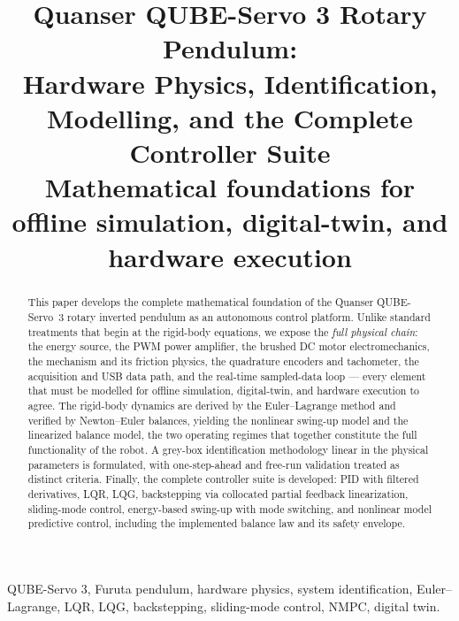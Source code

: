 \documentclass[conference]{IEEEtran}
\begin{document}
\title{Quanser QUBE-Servo 3 Rotary Pendulum:\\ Hardware Physics, Identification, Modelling, and the Complete Controller Suite\\
{\footnotesize Mathematical foundations for offline simulation, digital-twin, and hardware execution}}

\author{
}

\maketitle

\begin{abstract}
This paper develops the complete mathematical foundation of the Quanser QUBE-Servo~3 rotary inverted pendulum as an autonomous control platform. Unlike standard treatments that begin at the rigid-body equations, we expose the \emph{full physical chain}: the energy source, the PWM power amplifier, the brushed DC motor electromechanics, the mechanism and its friction physics, the quadrature encoders and tachometer, the acquisition and USB data path, and the real-time sampled-data loop --- every element that must be modelled for offline simulation, digital-twin, and hardware execution to agree. The rigid-body dynamics are derived by the Euler--Lagrange method and verified by Newton--Euler balances, yielding the nonlinear swing-up model and the linearized balance model, the two operating regimes that together constitute the full functionality of the robot. A grey-box identification methodology linear in the physical parameters is formulated, with one-step-ahead and free-run validation treated as distinct criteria. Finally, the complete controller suite is developed: PID with filtered derivatives, LQR, LQG, backstepping via collocated partial feedback linearization, sliding-mode control, energy-based swing-up with mode switching, and nonlinear model predictive control, including the implemented balance law and its safety envelope.
\end{abstract}

\begin{IEEEkeywords}
QUBE-Servo 3, Furuta pendulum, hardware physics, system identification, Euler--Lagrange, LQR, LQG, backstepping, sliding-mode control, NMPC, digital twin.
\end{IEEEkeywords}
\end{document}
